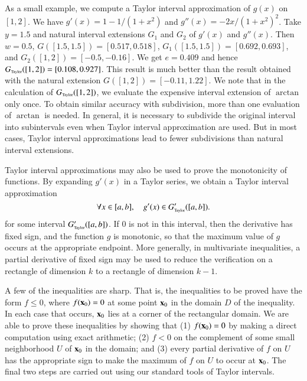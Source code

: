 As a small example, we compute a Taylor interval approximation of
$g(x)$ on $[1,2]$. We have $g'(x) = 1 - {1}/{(1 + x^2)}$ and $g''(x)
= {-2x}/{(1 + x^2)^2}$. Take $y = 1.5$ and natural interval
extensions $G_1$ and $G_2$ of $g'(x)$ and $g''(x)$. Then $w = 0.5$,
$G([1.5,1.5]) = [0.517,0.518]$, $G_1([1.5,1.5]) = [0.692,0.693]$, and
$G_2([1,2]) = [-0.5, -0.16]$. We get $e = 0.409$ and hence $G_{\hbox{\tiny Taylor}}([1,2])
= [0.108, 0.927]$. This result is much better than the result obtained
with the natural extension $G([1,2]) = [-0.11, 1.22]$. 
We note that in the calculation of $G_{\hbox{\tiny Taylor}}([1,2])$, we evaluate the
expensive interval extension of $\arctan$ only once.  To obtain
similar accuracy with subdivision, more than one evaluation of $\arctan$
is needed.  In general, it is necessary to subdivide the original
interval into subintervals even when Taylor interval approximation are
used. But in most cases, Taylor interval approximations lead to fewer
subdivisions than natural interval extensions.

Taylor interval approximations may also be used to
prove the monotonicity of functions.  By expanding $g'(x)$ in a 
Taylor series, we obtain a Taylor interval approximation
\begin{equation*}
\forall x \in [a,b], \quad g'(x) \in G_{\hbox{\tiny Taylor}}'([a,b]).
\end{equation*}
for some interval $G_{\hbox{\tiny Taylor}}'([a,b])$.  If $0$ is not in this interval, then the
derivative has fixed sign, and
the function $g$ is monotonic, so that the maximum value of $g$ occurs
at the appropriate endpoint.  More generally, in multivariate inequalities,
a partial derivative of fixed sign may be used to reduce the verification on a
rectangle of dimension $k$ to a rectangle of dimension $k-1$.

A few of the inequalities are sharp.  That is, the inequalities to be
proved have the form $f \le 0$, where $f({\bf x}_0)=0$ at some point ${\bf x}_0$
in the domain $D$ of the inequality.  In each case that occurs, ${\bf x}_0$ lies at a
corner of the rectangular domain.  We are able to prove these
inequalities by showing that (1) $f({\bf x}_0) = 0$ by making a direct
computation using exact arithmetic; (2) $f < 0$ on the complement of
some small neighborhood $U$ of ${\bf x}_0$ in the domain; and (3) every
partial derivative of $f$ on $U$ has the appropriate sign to make the
maximum of $f$ on $U$ to occur at ${\bf x}_0$.  The final two steps are
carried out using our standard tools of Taylor intervals.

